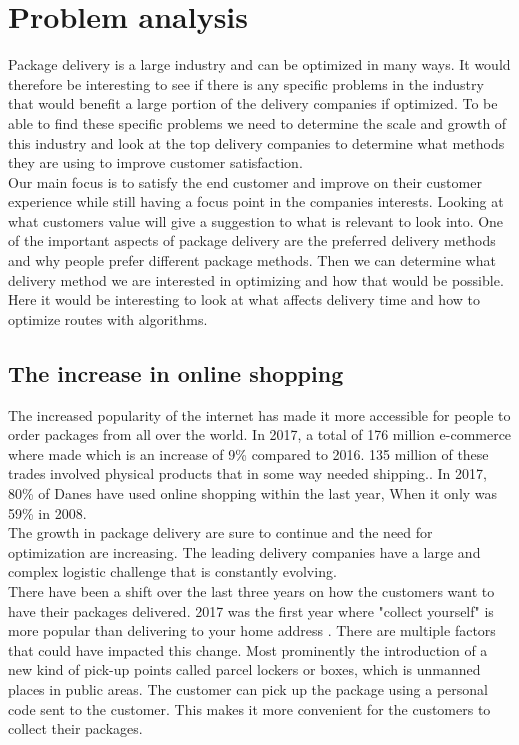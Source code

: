\documentclass[12pt]{report}
\begin{document}
\chapter{Problem analysis}
Package delivery is a large industry and can be optimized in many ways. It would therefore be interesting to see if there is any specific problems in the industry that would benefit a large portion of the delivery companies if optimized. To be able to find these specific problems we need to determine the scale and growth of this industry and look at the top delivery companies to determine what methods they are using to improve customer satisfaction. \\\hspace*{5 mm}
Our main focus is to satisfy the end customer and improve on their customer experience while still having a focus point in the companies interests. Looking at what customers value will give a suggestion to what is relevant to look into. One of the important aspects of package delivery are the preferred delivery methods and why people prefer different package methods. Then we can determine what delivery method we are interested in optimizing and how that would be possible. Here it would be interesting to look at what affects delivery time and how to optimize routes with algorithms.


\section{The increase in online shopping}
The increased popularity of the internet has made it more accessible for people to order packages from all over the world. In 2017, a total of 176 million e-commerce where made which is an increase of 9\% compared to 2016. 135 million of these trades involved physical products that in some way needed shipping.\cite{FDIHyearreport}. In 2017, 80\% of Danes have used online shopping within the last year, When it only was 59\% in 2008. \cite{Ehandel2017} \\\hspace*{5 mm}
The growth in package delivery are sure to continue and the need for optimization are increasing. The leading delivery companies have a large and complex logistic challenge that is constantly evolving.\cite{notsolved}
\\\hspace*{5 mm}
There have been a shift over the last three years on how the customers want to have their packages delivered. 2017 was the first year where "collect yourself" is more popular than delivering to your home address \cite{FDIHyearreport}. There are multiple factors that could have impacted this change. Most prominently the introduction of a new kind of pick-up points called parcel lockers or boxes, which is unmanned places in public areas. The customer can pick up the package using a personal code sent to the customer. This makes it more convenient for the customers to collect their packages. \\
\end{document}
